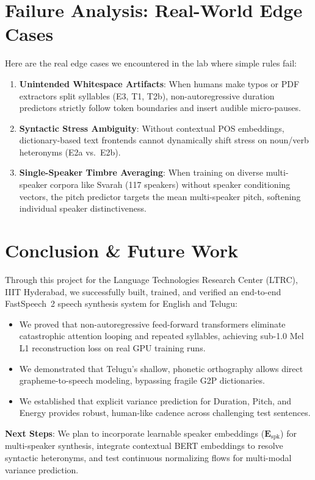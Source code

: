 \documentclass[11pt,a4paper]{article}
\begin{document}
\section{Failure Analysis: Real-World Edge Cases}

Here are the real edge cases we encountered in the lab where simple rules fail:
\begin{enumerate}
  \item \textbf{Unintended Whitespace Artifacts}: When humans make typos or PDF extractors split syllables (E3, T1, T2b), non-autoregressive duration predictors strictly follow token boundaries and insert audible micro-pauses.
  \item \textbf{Syntactic Stress Ambiguity}: Without contextual POS embeddings, dictionary-based text frontends cannot dynamically shift stress on noun/verb heteronyms (E2a vs.\ E2b).
  \item \textbf{Single-Speaker Timbre Averaging}: When training on diverse multi-speaker corpora like Svarah (117 speakers) without speaker conditioning vectors, the pitch predictor targets the mean multi-speaker pitch, softening individual speaker distinctiveness.
\end{enumerate}

\newpage

\section{Conclusion \& Future Work}

Through this project for the Language Technologies Research Center (LTRC), IIIT Hyderabad, we successfully built, trained, and verified an end-to-end FastSpeech~2 speech synthesis system for English and Telugu:
\begin{itemize}
  \item We proved that non-autoregressive feed-forward transformers eliminate catastrophic attention looping and repeated syllables, achieving sub-1.0 Mel L1 reconstruction loss on real GPU training runs.
  \item We demonstrated that Telugu's shallow, phonetic orthography allows direct grapheme-to-speech modeling, bypassing fragile G2P dictionaries.
  \item We established that explicit variance prediction for Duration, Pitch, and Energy provides robust, human-like cadence across challenging test sentences.
\end{itemize}

\noindent \textbf{Next Steps}: We plan to incorporate learnable speaker embeddings ($\mathbf{E}_{\text{spk}}$) for multi-speaker synthesis, integrate contextual BERT embeddings to resolve syntactic heteronyms, and test continuous normalizing flows for multi-modal variance prediction.
\end{document}
